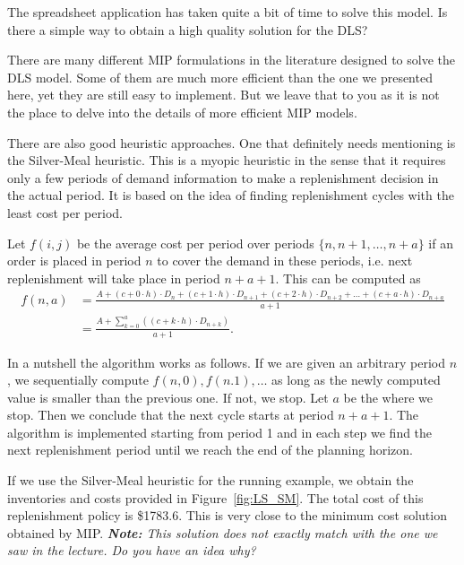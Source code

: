 \begin{question}
The spreadsheet application has taken quite a bit of time to solve this model. Is there a simple way to obtain a high quality solution for the DLS?
\end{question}

\begin{solution}
There are many different MIP formulations in the literature designed to solve the DLS model. Some of them are much more efficient than the one we presented here, yet they are still easy to implement. But we leave that to you as it is not the place to delve into the details of more efficient MIP models.

There are also good heuristic approaches. One that definitely needs mentioning is the Silver-Meal heuristic. This is a myopic heuristic in the sense that it requires only a few periods of demand information to make a replenishment decision in the actual period. It is based on the idea of finding replenishment cycles with the least cost per period. 

Let $f(i,j)$ be the average cost per period over periods $\{n,n+1,\ldots,n+a\}$ if an order is placed in period $n$ to cover the demand in these periods, i.e. next replenishment will take place in period $n+a+1$. This can be computed as
\begin{align*}
f(n,a) 
& = \frac{A + (c+0\cdot h) \cdot D_{n} + (c+1\cdot h)\cdot D_{n+1} + (c+2\cdot h)\cdot D_{n+2} + \ldots + (c+a\cdot h)\cdot D_{n+a}}{a+1} \\
& = \frac{A + \sum_{k=0}^a \left((c+k\cdot h)\cdot D_{n+k}\right)}{a+1}.
\end{align*}

In a nutshell the algorithm works as follows. If we are given an arbitrary period $n$, we sequentially compute $f(n,0),f(n.1),\ldots$ as long as the newly computed value is smaller than the previous one. If not, we stop. Let $a$ be the where we stop. Then we conclude that the next cycle starts at period $n+a+1$. The algorithm is implemented starting from period 1 and in each step we find the next replenishment period until we reach the end of the planning horizon.

If we use the Silver-Meal heuristic for the running example, we obtain the inventories and costs provided in Figure~\ref{fig:LS_SM}. The total cost of this replenishment policy is \$1783.6. This is very close to the minimum cost solution obtained by MIP. \textit{\textbf{Note:} This solution does not exactly match with the one we saw in the lecture. Do you have an idea why?}
 
\end{solution}

